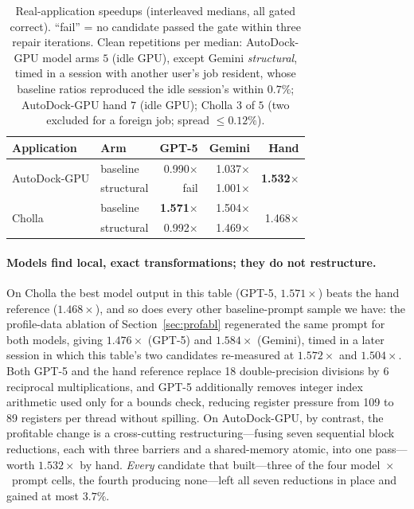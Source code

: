 \begin{table}[t]
\centering
\footnotesize
\caption{Real-application speedups (interleaved medians, all gated correct).
  ``fail'' = no candidate passed the gate within three repair iterations.
  Clean repetitions per median: AutoDock-GPU model arms $5$ (idle GPU), except Gemini
  \emph{structural}, timed in a session with another user's job resident, whose baseline ratios
  reproduced the idle session's within $0.7\%$; AutoDock-GPU hand $7$ (idle GPU); Cholla $3$ of $5$
  (two excluded for a foreign job; spread $\le 0.12\%$).}
\label{tab:realapps}
\setlength{\tabcolsep}{3pt}
\begin{tabular}{@{}llrrr@{}}
\toprule
\textbf{Application} & \textbf{Arm} & \textbf{GPT-5} & \textbf{Gemini} & \textbf{Hand} \\
\midrule
\multirow{2}{*}{AutoDock-GPU}
  & baseline    & 0.990$\times$ & 1.037$\times$ & \multirow{2}{*}{\textbf{1.532}$\times$} \\
  & structural  & fail          & 1.001$\times$ & \\
\midrule
\multirow{2}{*}{Cholla}
  & baseline    & \textbf{1.571}$\times$ & 1.504$\times$ & \multirow{2}{*}{1.468$\times$} \\
  & structural  & 0.992$\times$ & 1.469$\times$ & \\
\bottomrule
\end{tabular}
\end{table}

\paragraph{Models find local, exact transformations; they do not restructure.}
On Cholla the best model output in this table (GPT-5, $1.571\times$) beats the hand reference
($1.468\times$), and so does every other baseline-prompt sample we have: the profile-data ablation of
Section~\ref{sec:profabl} regenerated the same prompt for both models, giving $1.476\times$ (GPT-5)
and $1.584\times$ (Gemini), timed in a later session in which this table's two candidates
re-measured at $1.572\times$ and $1.504\times$. Both GPT-5 and the hand reference
replace 18 double-precision divisions by 6 reciprocal multiplications, and GPT-5 additionally removes
integer index arithmetic used only for a bounds check, reducing register pressure from 109 to 89
registers per thread without spilling. On AutoDock-GPU, by contrast, the profitable change is a
cross-cutting restructuring---fusing seven sequential block reductions, each with three barriers and a
shared-memory atomic, into one pass---worth $1.532\times$ by hand. \emph{Every} candidate that built---three
of the four model~$\times$~prompt cells, the fourth producing none---left all seven reductions in place
and gained at most $3.7\%$.


